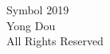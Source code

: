 

\newcommand{\CopyrightYear}{2019}


\begin{titlepage}
\begin{singlespacing}
\begin{center}

\vspace*{35\baselineskip}

Symbol \CopyrightYear\\
\vspace{\baselineskip}	
Yong Dou\\
\vspace{\baselineskip}	
All Rights Reserved
\end{center}
\vfill

\end{singlespacing}
\end{titlepage}
